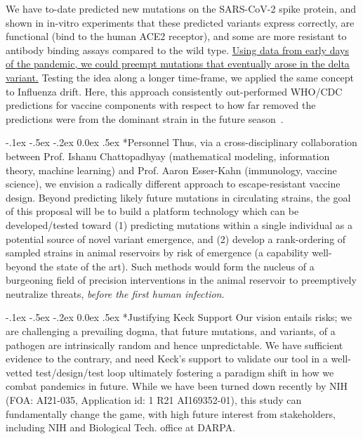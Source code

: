 \documentclass[onecolumn, compsoc,12pt]{IEEEtran}
\makeatletter
\renewcommand\paragraph{\@startsection {section}{1}{\z@}%
                                   {-.1ex \@plus -.5ex \@minus -.2ex}%
                                   {0.0ex \@plus.5ex}%
                                   {\fontsize{11}{10}\selectfont\bfseries\itshape\sffamily\color{black}}}
\def\hcov{SARS-CoV-2\xspace}
\makeatother
\begin{document}
We have to-date predicted new mutations on the \hcov spike protein, and shown in in-vitro experiments that these  predicted variants express correctly, are functional (bind to the human ACE2 receptor), and some are more resistant to antibody binding assays compared to the wild type. \uline{Using data from early days of the pandemic, we could preempt mutations that eventually arose in the delta variant.} Testing the idea along a longer time-frame, we applied the same concept to Influenza drift. Here, this approach consistently out-performed WHO/CDC predictions for vaccine components with respect to how far removed the predictions were  from the dominant strain in the future season~\cite{Li2020.07.17.20156364}.

\paragraph*{Personnel} Thus, via a cross-disciplinary collaboration  between Prof. Ishanu Chattopadhyay (mathematical modeling, information theory, machine learning) and Prof. Aaron Esser-Kahn (immunology, vaccine science), we envision a radically different approach to escape-resistant vaccine design. Beyond  predicting likely future mutations in circulating strains, the goal of this proposal will be to build a platform technology which can be developed/tested toward (1) predicting mutations within a single individual as a potential source of novel variant emergence, and (2) develop a rank-ordering of  sampled strains in animal reservoirs by  risk of emergence (a capability well-beyond the state of the art). Such methods would form the nucleus of a burgeoning field of precision  interventions  in the animal reservoir to preemptively neutralize threats,  \textit{before the first human infection}.

\paragraph*{Justifying Keck Support} Our vision   entails  risks;  we are challenging a prevailing dogma, that future mutations, and variants, of a pathogen are intrinsically random and hence unpredictable.  We have sufficient evidence to the contrary, and need Keck's support to validate our tool in a well-vetted test/design/test loop  ultimately fostering a paradigm shift in  how we combat pandemics in future. While we have been turned down recently by NIH (FOA: AI21-035, Application id: 1 R21 AI169352-01), this study can fundamentally change the game, with high future interest from stakeholders, including NIH and Biological Tech. office at DARPA.
\end{document}
